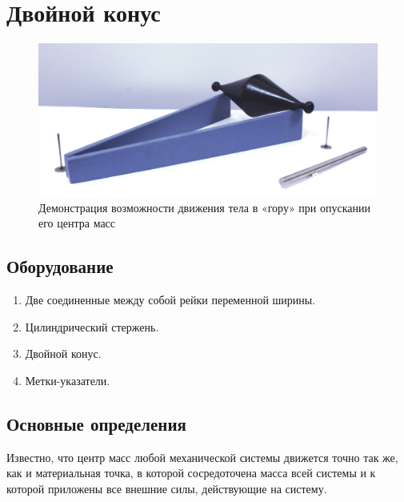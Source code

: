\documentclass[All.tex]{subfiles}
\begin{document}
	
		\section{Двойной конус}
	
	\begin{figure}[H] 
		\centering 
		\includegraphics[width=0.9\linewidth]{center-3.png}
		\caption{Демонстрация возможности движения тела в «гору» при опускании его центра масс}
		\label{center-3}
	\end{figure}
	
	\subsection*{\textcolor{PineGreen}{Оборудование}}
	
	\begin{enumerate} 
		\item Две соединенные между собой рейки переменной ширины.
		\item Цилиндрический стержень.
		\item Двойной конус.
		\item Метки-указатели.
	\end{enumerate}

	\subsection*{\textcolor{PineGreen}{Основные определения}}
	
	Известно, что центр масс любой механической системы движется точно так же, как и материальная точка, в которой сосредоточена масса всей системы и к которой приложены все внешние силы, действующие на систему.
	
\end{document}
